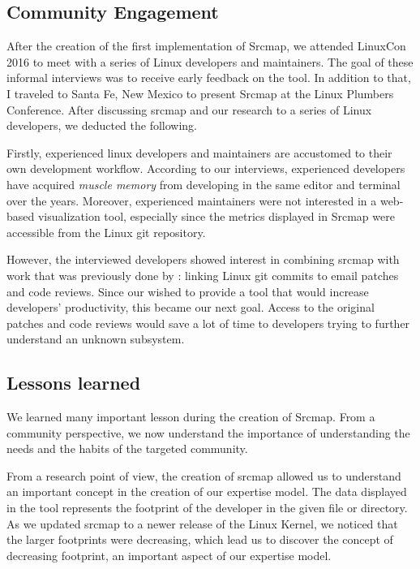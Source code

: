 \subsection{Community Engagement}

After the creation of the first implementation of Srcmap, we attended LinuxCon 2016 to meet with a series of Linux developers and maintainers. The goal of these informal interviews was to receive early feedback on the tool. In addition to that, I traveled to Santa Fe, New Mexico to present Srcmap at the Linux Plumbers Conference. After discussing srcmap and our research to a series of Linux developers, we deducted the following. 

Firstly, experienced linux developers and maintainers are accustomed to their own development workflow. According to our interviews, experienced developers have acquired \textit{muscle memory} from developing in the same editor and terminal over the years. Moreover, experienced maintainers were not interested in a web-based visualization tool, especially since the metrics displayed in Srcmap were accessible from the Linux git repository. 

However, the interviewed developers showed interest in combining srcmap with work that was previously done by \cite{jiang14}: linking Linux git commits to email patches and code reviews. Since our wished to provide a tool that would increase developers' productivity, this became our next goal. Access to the original patches and code reviews would save a lot of time to developers trying to further understand an unknown subsystem. 



\subsection{Lessons learned}
\label{sec:lessons_srcmap}

We learned many important lesson during the creation of Srcmap.  From a community perspective, we now understand the importance of understanding the needs and the habits of the targeted community. 


From a research point of view, the creation of srcmap allowed us to understand an important concept in the creation of our expertise model. The data displayed in the tool represents the footprint of the developer in the given file or directory. As we updated srcmap to a newer release of the Linux Kernel, we noticed that the larger footprints were decreasing, which lead us to discover the concept of decreasing footprint, an important aspect of our expertise model. 


